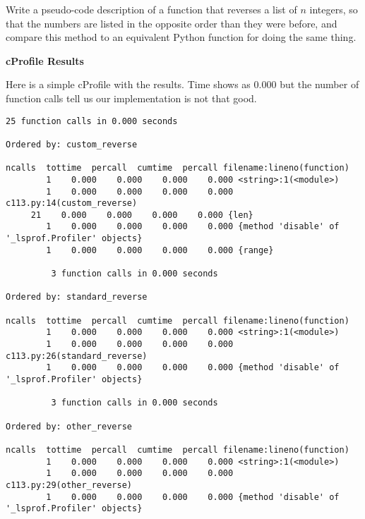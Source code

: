  \label{sssec:ex1_13}

Write a pseudo-code description of a function that reverses a list of $n$ integers, so that the numbers are listed in the opposite order than they were before, and compare this method to an equivalent Python function for doing the same thing.



\large\textbf{cProfile Results}

Here is a simple cProfile with the results. Time shows as $0.000$ but the number of function calls tell us our implementation is not that good. 

\begin{lstlisting}
25 function calls in 0.000 seconds

Ordered by: custom_reverse

ncalls  tottime  percall  cumtime  percall filename:lineno(function)
		1    0.000    0.000    0.000    0.000 <string>:1(<module>)
		1    0.000    0.000    0.000    0.000 c113.py:14(custom_reverse)
	 21    0.000    0.000    0.000    0.000 {len}
		1    0.000    0.000    0.000    0.000 {method 'disable' of '_lsprof.Profiler' objects}
		1    0.000    0.000    0.000    0.000 {range}

		 3 function calls in 0.000 seconds

Ordered by: standard_reverse

ncalls  tottime  percall  cumtime  percall filename:lineno(function)
		1    0.000    0.000    0.000    0.000 <string>:1(<module>)
		1    0.000    0.000    0.000    0.000 c113.py:26(standard_reverse)
		1    0.000    0.000    0.000    0.000 {method 'disable' of '_lsprof.Profiler' objects}

		 3 function calls in 0.000 seconds

Ordered by: other_reverse

ncalls  tottime  percall  cumtime  percall filename:lineno(function)
		1    0.000    0.000    0.000    0.000 <string>:1(<module>)
		1    0.000    0.000    0.000    0.000 c113.py:29(other_reverse)
		1    0.000    0.000    0.000    0.000 {method 'disable' of '_lsprof.Profiler' objects}
\end{lstlisting}

